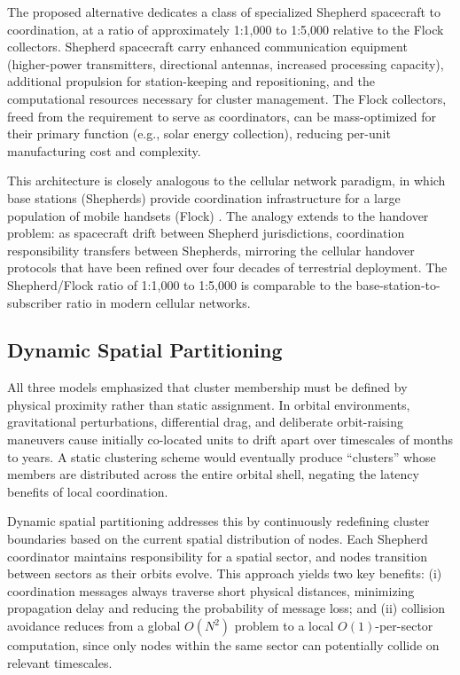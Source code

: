 \documentclass[journal]{IEEEtran}
\begin{document}
The proposed alternative dedicates a class of specialized Shepherd spacecraft to coordination, at a ratio of approximately 1:1{,}000 to 1:5{,}000 relative to the Flock collectors. Shepherd spacecraft carry enhanced communication equipment (higher-power transmitters, directional antennas, increased processing capacity), additional propulsion for station-keeping and repositioning, and the computational resources necessary for cluster management. The Flock collectors, freed from the requirement to serve as coordinators, can be mass-optimized for their primary function (e.g., solar energy collection), reducing per-unit manufacturing cost and complexity.

This architecture is closely analogous to the cellular network paradigm, in which base stations (Shepherds) provide coordination infrastructure for a large population of mobile handsets (Flock) \cite{rappaport_wireless}. The analogy extends to the handover problem: as spacecraft drift between Shepherd jurisdictions, coordination responsibility transfers between Shepherds, mirroring the cellular handover protocols that have been refined over four decades of terrestrial deployment. The Shepherd/Flock ratio of 1:1{,}000 to 1:5{,}000 is comparable to the base-station-to-subscriber ratio in modern cellular networks.

\subsection{Dynamic Spatial Partitioning}

All three models emphasized that cluster membership must be defined by physical proximity rather than static assignment. In orbital environments, gravitational perturbations, differential drag, and deliberate orbit-raising maneuvers cause initially co-located units to drift apart over timescales of months to years. A static clustering scheme would eventually produce ``clusters'' whose members are distributed across the entire orbital shell, negating the latency benefits of local coordination.

Dynamic spatial partitioning addresses this by continuously redefining cluster boundaries based on the current spatial distribution of nodes. Each Shepherd coordinator maintains responsibility for a spatial sector, and nodes transition between sectors as their orbits evolve. This approach yields two key benefits: (i) coordination messages always traverse short physical distances, minimizing propagation delay and reducing the probability of message loss; and (ii) collision avoidance reduces from a global $O(N^2)$ problem to a local $O(1)$-per-sector computation, since only nodes within the same sector can potentially collide on relevant timescales.
\end{document}
